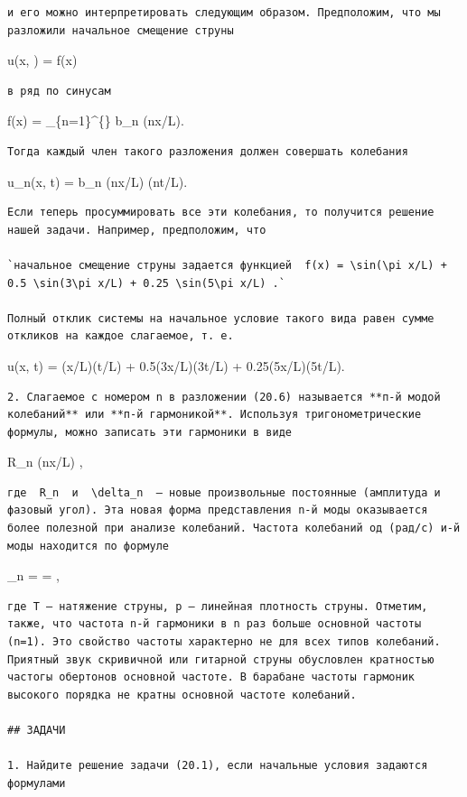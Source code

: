 \documentclass[
  ukrainian,
]{article}
\begin{document}
\begin{verbatim}
и его можно интерпретировать следующим образом. Предположим, что мы разложили начальное смещение струны
\end{verbatim}

u(x, \theta) = f(x)

\begin{verbatim}
в ряд по синусам
\end{verbatim}

f(x) = \sum\_\{n=1\}\^{}\{\infty\} b\_n \sin(n\pi x/L).

\begin{verbatim}
Тогда каждый член такого разложения должен совершать колебания
\end{verbatim}

u\_n(x, t) = b\_n \sin(n\pi x/L) \cos(n\pi\alpha t/L).

\begin{verbatim}
Если теперь просуммировать все эти колебания, то получится решение нашей задачи. Например, предположим, что

`начальное смещение струны задается функцией  f(x) = \sin(\pi x/L) + 0.5 \sin(3\pi x/L) + 0.25 \sin(5\pi x/L) .`

Полный отклик системы на начальное условие такого вида равен сумме откликов на каждое слагаемое, т. е.
\end{verbatim}

u(x, t) = \sin(\pi x/L)\cos(\pi \alpha t/L) +
0.5\sin(3\pi x/L)\cos(3\pi \alpha t/L) +
0.25\sin(5\pi x/L)\cos(5\pi \alpha t/L).

\begin{verbatim}
2. Слагаемое с номером n в разложении (20.6) называется **п-й модой колебаний** или **п-й гармоникой**. Используя тригонометрические формулы, можно записать эти гармоники в виде
\end{verbatim}

R\_n \sin(n\pi x/L) ,

\begin{verbatim}
где  R_n  и  \delta_n  — новые произвольные постоянные (амплитуда и фазовый угол). Эта новая форма представления n-й моды оказывается более полезной при анализе колебаний. Частота колебаний од (рад/с) и-й моды находится по формуле
\end{verbatim}

\omega\_n =  =  ,

\begin{verbatim}
где Т — натяжение струны, р — линейная плотность струны. Отметим, также, что частота n-й гармоники в n раз больше основной частоты (n=1). Это свойство частоты характерно не для всех типов колебаний. Приятный звук скривичной или гитарной струны обусловлен кратностью частогы обертонов основной частоте. В барабане частоты гармоник высокого порядка не кратны основной частоте колебаний.

## ЗАДАЧИ

1. Найдите решение задачи (20.1), если начальные условия задаются формулами
\end{verbatim}
\end{document}
